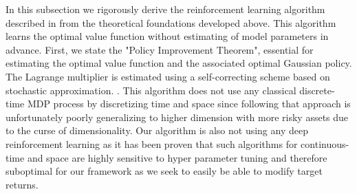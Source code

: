 \documentclass[oneside, a4paper, onecolumn, 11pt]{article}
\begin{document}
In this subsection we rigorously derive the reinforcement learning algorithm described in \cite{WangZhou2020} from the theoretical foundations developed above. 
This algorithm learns the optimal value function without  estimating of model parameters in advance. 
First, we state the "Policy Improvement Theorem", essential for estimating the optimal value function and the associated optimal Gaussian policy. The Lagrange multiplier is estimated using a self-correcting scheme based on stochastic approximation. \cite{WangZhou2020}. This algorithm does not use any classical discrete-time MDP process by discretizing time and space since following that approach is unfortunately poorly generalizing to higher dimension with more risky assets due to the curse of dimensionality. Our algorithm is also not using any deep reinforcement learning as it has been proven that such algorithms for continuous-time and space are highly sensitive to hyper parameter tuning \cite{Mnih2015} and therefore suboptimal for our framework as we seek to easily be able to modify target returns.
\end{document}
